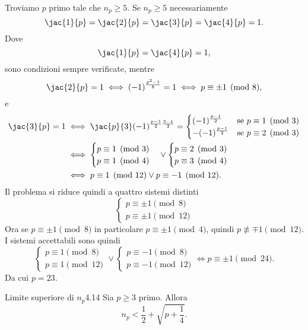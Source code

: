 \begin{ese}
	Troviamo \(p\) primo tale che \(n_p\ge 5\).
	Se \(n_p\ge 5\) necessariamente
	\[
		\jac{1}{p} = \jac{2}{p} = \jac{3}{p} = \jac{4}{p} = 1.
	\]
	Dove
	\[
		\jac{1}{p}=\jac{4}{p} = 1,
	\]
	sono condizioni sempre verificate, mentre
	\[
		\jac{2}{p} = 1 \iff (-1)^{\frac{p^2-1}{8}} = 1 \iff p\equiv \pm 1 \pmod{8},
	\]
	e
	\[
		\begin{split}
			\jac{3}{p} = 1 & \iff \jac{p}{3}(-1)^{\frac{p-1}{2}\frac{3-1}{2}} = \begin{cases}
				(-1)^{\frac{p-1}{2}}  & \text{se }p\equiv 1 \pmod{3} \\
				-(-1)^{\frac{p-1}{2}} & \text{se }p\equiv 2 \pmod{3}
			\end{cases}\\
			& \iff \begin{cases}p\equiv 1 \pmod{3}\\p\equiv 1 \pmod{4}\end{cases} \vee \begin{cases}p\equiv 2\pmod{3}\\p\equiv 3 \pmod{4}\end{cases}\\
			& \iff p\equiv 1 \pmod{12} \vee p\equiv -1\pmod{12}.
		\end{split}
	\]
	Il problema si riduce quindi a quattro sistemi distinti
	\[
		\begin{cases}
			p\equiv \pm 1 \pmod{8} \\
			p\equiv \pm 1 \pmod{12}
		\end{cases}
	\]
	Ora se \(p\equiv \pm 1\pmod{8}\) in particolare \(p\equiv \pm 1\pmod{4}\), quindi \(p\not\equiv \mp 1 \pmod{12}\).
	I sistemi accettabili sono quindi
	\[
		\begin{cases}
			p\equiv 1 \pmod{8} \\
			p\equiv 1 \pmod{12}
		\end{cases}
		\vee
		\begin{cases}
			p\equiv -1 \pmod{8} \\
			p\equiv -1 \pmod{12}
		\end{cases}
		\iff p\equiv \pm 1\pmod{24}.
	\]
	Da cui \(p=23\).
\end{ese}

\begin{teor}{Limite superiore di \(n_p\)}{4.14}
	Sia \(p\ge 3\) primo.
	Allora
	\[
		n_p < \frac{1}{2} + \sqrt{p+\frac{1}{4}}.
	\]
\end{teor}

